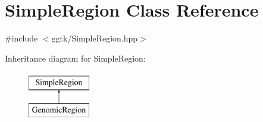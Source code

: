 \hypertarget{classSimpleRegion}{}\section{Simple\+Region Class Reference}
\label{classSimpleRegion}


{\ttfamily \#include $<$ggtk/\+Simple\+Region.\+hpp$>$}

Inheritance diagram for Simple\+Region\+:\begin{figure}[H]
\begin{center}
\leavevmode
\includegraphics[height=2.000000cm]{classSimpleRegion}
\end{center}
\end{figure}
